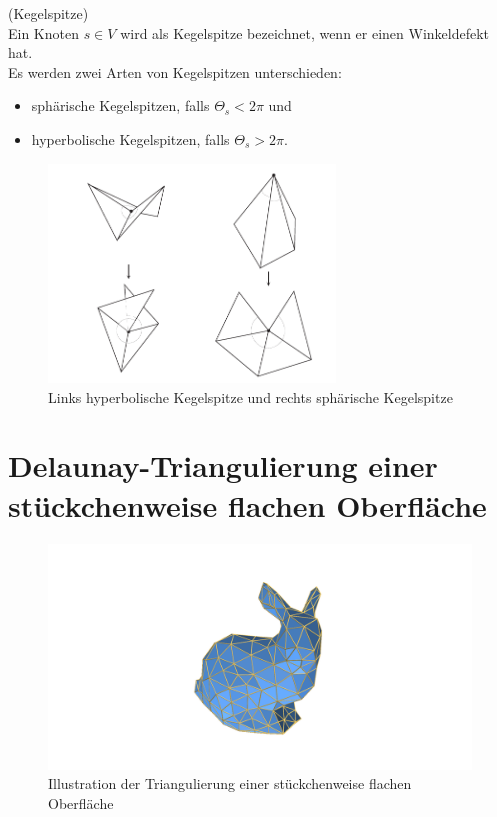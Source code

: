 \begin{definition}(Kegelspitze)\\

Ein Knoten $s \in V$  wird als Kegelspitze bezeichnet, wenn er einen Winkeldefekt hat.\\
 
Es werden zwei Arten von Kegelspitzen unterschieden:
 \begin{itemize}
     \item sphärische Kegelspitzen, falls $\Theta_s < 2\pi $ und 
     \item hyperbolische Kegelspitzen, falls $\Theta_s > 2\pi $.
 \end{itemize} 


\begin{figure}[h]%
    \centering
  \includegraphics[width=3in]{images/Merged_document.png}
  \caption{Links hyperbolische Kegelspitze und rechts sphärische Kegelspitze   \cite{Polthier:2006:SIGGRAPH}}
\end{figure}
 

\end{definition}

\section*{Delaunay-Triangulierung einer stückchenweise flachen Oberfläche}
\begin{figure}[H]%
    \centering
    \includegraphics[width=5in]{images/image1.png}
  \caption{Illustration der Triangulierung einer stückchenweise flachen Oberfläche}
   \label{fig:hase}
\end{figure}


